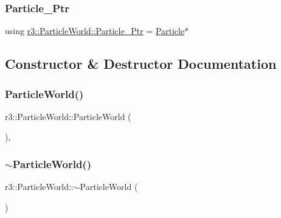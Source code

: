 \subsubsection{\texorpdfstring{Particle\+\_\+\+Ptr}{Particle\_Ptr}}
{\footnotesize\ttfamily using \mbox{\hyperlink{classr3_1_1_particle_world_a12b4624a202a6b22629a3328f083ac81}{r3\+::\+Particle\+World\+::\+Particle\+\_\+\+Ptr}} =  \mbox{\hyperlink{classr3_1_1_particle}{Particle}}$\ast$}



\subsection{Constructor \& Destructor Documentation}
\mbox{\label{classr3_1_1_particle_world_a5cd4bf68559cd0e1194420d3233b095e}} 
\subsubsection{\texorpdfstring{Particle\+World()}{ParticleWorld()}}
{\footnotesize\ttfamily r3\+::\+Particle\+World\+::\+Particle\+World (\begin{DoxyParamCaption}{ }\end{DoxyParamCaption})\hspace{0.3cm}{\ttfamily [explicit]}, {\ttfamily [default]}}

\mbox{\label{classr3_1_1_particle_world_a3a6d6f87b726156c41d4282c6dbb1e48}} 
\subsubsection{\texorpdfstring{$\sim$\+Particle\+World()}{~ParticleWorld()}}
{\footnotesize\ttfamily r3\+::\+Particle\+World\+::$\sim$\+Particle\+World (\begin{DoxyParamCaption}{ }\end{DoxyParamCaption})\hspace{0.3cm}{\ttfamily [default]}}



